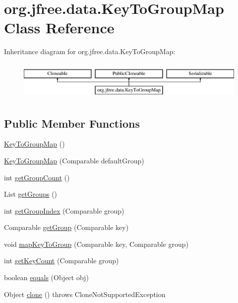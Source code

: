 \hypertarget{classorg_1_1jfree_1_1data_1_1_key_to_group_map}{}\section{org.\+jfree.\+data.\+Key\+To\+Group\+Map Class Reference}
\label{classorg_1_1jfree_1_1data_1_1_key_to_group_map}
Inheritance diagram for org.\+jfree.\+data.\+Key\+To\+Group\+Map\+:\begin{figure}[H]
\begin{center}
\leavevmode
\includegraphics[height=1.895093cm]{classorg_1_1jfree_1_1data_1_1_key_to_group_map}
\end{center}
\end{figure}
\subsection*{Public Member Functions}
\begin{DoxyCompactItemize}
\item 
\mbox{\hyperlink{classorg_1_1jfree_1_1data_1_1_key_to_group_map_a60f0f4c2db41a8b1dc1a930833b4db9a}{Key\+To\+Group\+Map}} ()
\item 
\mbox{\hyperlink{classorg_1_1jfree_1_1data_1_1_key_to_group_map_adeedd47529ee54b0b7e3ae6afe761138}{Key\+To\+Group\+Map}} (Comparable default\+Group)
\item 
int \mbox{\hyperlink{classorg_1_1jfree_1_1data_1_1_key_to_group_map_aec3a2769cb4d32c1fa2a80424a742410}{get\+Group\+Count}} ()
\item 
List \mbox{\hyperlink{classorg_1_1jfree_1_1data_1_1_key_to_group_map_a180ffccd4ce5cef6a97905fd65239e35}{get\+Groups}} ()
\item 
int \mbox{\hyperlink{classorg_1_1jfree_1_1data_1_1_key_to_group_map_aedd18f19547a3ea5b0bbc2c66b5955da}{get\+Group\+Index}} (Comparable group)
\item 
Comparable \mbox{\hyperlink{classorg_1_1jfree_1_1data_1_1_key_to_group_map_a67c6168790346b7722c8c0ea1780d24a}{get\+Group}} (Comparable key)
\item 
void \mbox{\hyperlink{classorg_1_1jfree_1_1data_1_1_key_to_group_map_a61a66692879a5ade8630026690152797}{map\+Key\+To\+Group}} (Comparable key, Comparable group)
\item 
int \mbox{\hyperlink{classorg_1_1jfree_1_1data_1_1_key_to_group_map_affb83a01616bc838d5e7e04d44eebb20}{get\+Key\+Count}} (Comparable group)
\item 
boolean \mbox{\hyperlink{classorg_1_1jfree_1_1data_1_1_key_to_group_map_a1f8872d18a0f85f2c9ff8bcca507d359}{equals}} (Object obj)
\item 
Object \mbox{\hyperlink{classorg_1_1jfree_1_1data_1_1_key_to_group_map_a2c5cdd3650a85cfd2b467a930f859f46}{clone}} ()  throws Clone\+Not\+Supported\+Exception 
\end{DoxyCompactItemize}


